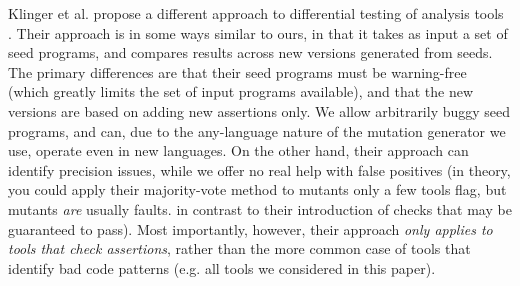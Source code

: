 Klinger et al. propose a different approach to differential testing of analysis tools \cite{klinger2019differentially}.  Their approach is in some ways similar to ours, in that it takes as input a set of seed programs, and compares results across new versions generated from seeds.  The primary differences are that their seed programs must be warning-free (which greatly limits the set of input programs available), and that the new versions are based on adding new assertions only.  We allow arbitrarily buggy seed programs, and can, due to the any-language nature of the mutation generator we use, operate even in new languages.  On the other hand, their approach can identify precision issues, while we offer no real help with false positives (in theory, you could apply their majority-vote method to mutants only a few tools flag, but mutants \emph{are} usually faults. in contrast to their introduction of checks that may be guaranteed to pass).  Most importantly, however, their approach \emph{only applies to tools that check assertions}, rather than the more common case of tools that identify bad code patterns (e.g. all tools we considered in this paper).
